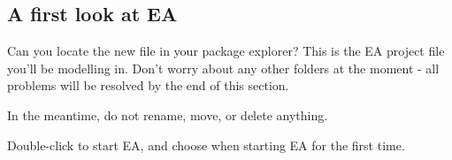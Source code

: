 \clearpage
\genHeader

\subsection{A first look at EA}

\begin{stepbystep}
\FloatBarrier
\hypertarget{simpleDemo vis}{}
\item Can you locate the new  file in your package explorer? This is the EA project file you'll be
modelling in. Don't worry about any other folders at the moment - all problems will be resolved by the end of this section.

In the meantime, do not rename, move, or delete anything.

\item Double-click  to start EA, and choose  when starting EA for the first time.


\end{stepbystep}
